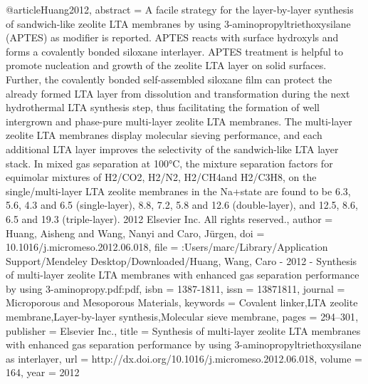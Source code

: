 @article{Huang2012,
abstract = {A facile strategy for the layer-by-layer synthesis of sandwich-like zeolite LTA membranes by using 3-aminopropyltriethoxysilane (APTES) as modifier is reported. APTES reacts with surface hydroxyls and forms a covalently bonded siloxane interlayer. APTES treatment is helpful to promote nucleation and growth of the zeolite LTA layer on solid surfaces. Further, the covalently bonded self-assembled siloxane film can protect the already formed LTA layer from dissolution and transformation during the next hydrothermal LTA synthesis step, thus facilitating the formation of well intergrown and phase-pure multi-layer zeolite LTA membranes. The multi-layer zeolite LTA membranes display molecular sieving performance, and each additional LTA layer improves the selectivity of the sandwich-like LTA layer stack. In mixed gas separation at 100°C, the mixture separation factors for equimolar mixtures of H2/CO2, H2/N2, H2/CH4and H2/C3H8, on the single/multi-layer LTA zeolite membranes in the Na+state are found to be 6.3, 5.6, 4.3 and 6.5 (single-layer), 8.8, 7.2, 5.8 and 12.6 (double-layer), and 12.5, 8.6, 6.5 and 19.3 (triple-layer). {\textcopyright} 2012 Elsevier Inc. All rights reserved.},
author = {Huang, Aisheng and Wang, Nanyi and Caro, J{\"{u}}rgen},
doi = {10.1016/j.micromeso.2012.06.018},
file = {:Users/marc/Library/Application Support/Mendeley Desktop/Downloaded/Huang, Wang, Caro - 2012 - Synthesis of multi-layer zeolite LTA membranes with enhanced gas separation performance by using 3-aminopropy.pdf:pdf},
isbn = {1387-1811},
issn = {13871811},
journal = {Microporous and Mesoporous Materials},
keywords = {Covalent linker,LTA zeolite membrane,Layer-by-layer synthesis,Molecular sieve membrane},
pages = {294--301},
publisher = {Elsevier Inc.},
title = {{Synthesis of multi-layer zeolite LTA membranes with enhanced gas separation performance by using 3-aminopropyltriethoxysilane as interlayer}},
url = {http://dx.doi.org/10.1016/j.micromeso.2012.06.018},
volume = {164},
year = {2012}
}
